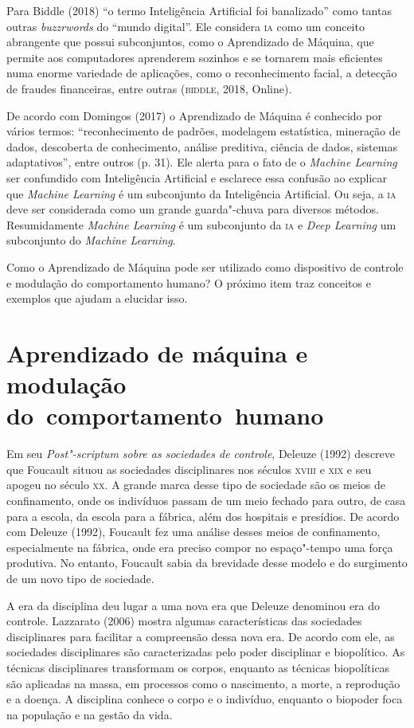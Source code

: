 Para Biddle (2018) ``o termo Inteligência Artificial foi banalizado''
como tantas outras \emph{buzzrwords} do ``mundo digital''. Ele considera
\textsc{ia} como um conceito abrangente que possui subconjuntos, como o
Aprendizado de Máquina, que permite aos computadores aprenderem sozinhos
e se tornarem mais eficientes numa enorme variedade de aplicações, como
o reconhecimento facial, a detecção de fraudes financeiras, entre outras
(\textsc{biddle}, 2018, Online).

De acordo com Domingos (2017) o Aprendizado de Máquina é conhecido por
vários termos: ``reconhecimento de padrões, modelagem estatística,
mineração de dados, descoberta de conhecimento, análise preditiva,
ciência de dados, sistemas adaptativos'', entre outros (p. 31). Ele
alerta para o fato de o \emph{Machine Learning} ser confundido com
Inteligência Artificial e esclarece essa confusão ao explicar que
\emph{Machine Learning} é um subconjunto da Inteligência Artificial. Ou
seja, a \textsc{ia} deve ser considerada como um grande guarda"-chuva para
diversos métodos. Resumidamente \emph{Machine Learning} é um subconjunto
da \textsc{ia} e \emph{Deep Learning} um subconjunto do \emph{Machine Learning}.

Como o Aprendizado de Máquina pode ser utilizado como dispositivo de
controle e modulação do comportamento humano? O próximo item traz
conceitos e exemplos que ajudam a elucidar isso.

\section{Aprendizado de máquina e modulação do~comportamento~humano}

\noindent{}Em seu \emph{Post"-scriptum sobre as sociedades de controle}, Deleuze
(1992) descreve que Foucault situou as sociedades disciplinares nos
séculos \textsc{xviii} e \textsc{xix} e seu apogeu no século \textsc{xx}. A grande marca desse tipo
de sociedade são os meios de confinamento, onde os indivíduos passam de
um meio fechado para outro, de casa para a escola, da escola para a
fábrica, além dos hospitais e presídios. De acordo com Deleuze (1992),
Foucault fez uma análise desses meios de confinamento, especialmente na
fábrica, onde era preciso compor no espaço"-tempo uma força produtiva. No
entanto, Foucault sabia da brevidade desse modelo e do surgimento de um
novo tipo de sociedade.

A era da disciplina deu lugar a uma nova era que Deleuze denominou era
do controle. Lazzarato (2006) mostra algumas características das
sociedades disciplinares para facilitar a compreensão dessa nova era. De
acordo com ele, as sociedades disciplinares são caracterizadas pelo
poder disciplinar e biopolítico. As técnicas disciplinares transformam
os corpos, enquanto as técnicas biopolíticas são aplicadas na massa, em
processos como o nascimento, a morte, a reprodução e a doença. A
disciplina conhece o corpo e o indivíduo, enquanto o biopoder foca na
população e na gestão da vida.

